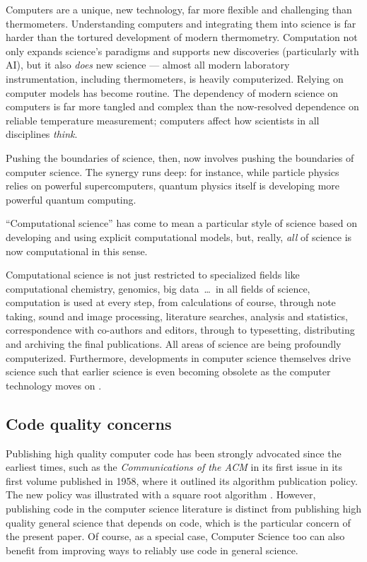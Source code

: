 \documentclass{comjnl}
\begin{document}
Computers are a unique, new technology, far more flexible and challenging than thermometers. Understanding computers and integrating them into science is far harder than the tortured development of modern thermometry. Computation not only expands science's paradigms and supports new discoveries (particularly with AI), but it also \emph{does\/} new science --- almost all modern laboratory instrumentation, including thermometers, is heavily computerized. Relying on computer models has become routine. The dependency of modern science on computers is far more tangled and complex than the now-resolved dependence on reliable temperature measurement; computers affect how scientists in all disciplines \emph{think}.

Pushing the boundaries of science, then, now involves pushing the boundaries of computer science. The synergy runs deep: for instance, while particle physics relies on powerful supercomputers, quantum physics itself is developing more powerful quantum computing.

``Computational science'' has come to mean a particular style of science based on developing and using explicit computational models, but, really, \emph{all\/} of science is now computational in this sense. 

Computational science is not just restricted to specialized fields like computational chemistry, genomics, big data~\ldots\ in all fields of science, computation is used at every step, from calculations of course, through note taking, sound and image processing, literature searches, analysis and statistics, correspondence with co-authors and editors, through to typesetting,  distributing and archiving the final publications. All areas of science are being profoundly computerized. Furthermore, developments in computer science themselves drive science such that earlier science is even becoming obsolete as the computer technology moves on \cite{form}.

\subsection{Code quality concerns}\label{related-work}
Publishing high quality computer code has been strongly advocated since the earliest times, such as the \emph{Communications of the ACM\/} in its first issue in its first volume published in 1958, where it outlined its algorithm publication policy. The new policy was illustrated with a square root algorithm \cite{acm-algorithms}. However, publishing code in the computer science literature is distinct from publishing high quality general science that depends on code, which is the particular concern of the present paper. Of course, as a special case, Computer Science too can also benefit from improving ways to reliably use code in general science.
\end{document}
